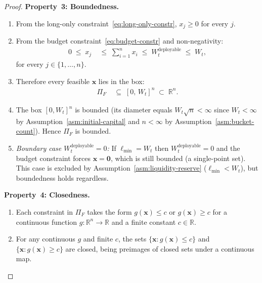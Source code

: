 \documentclass[12pt,openany]{book}
\newcommand{\bfx}{\mathbf{x}}
\numberwithin{equation}{chapter}
\theoremstyle{plain}
\theoremstyle{definition}
\theoremstyle{remark}
\numberwithin{equation}{chapter}
\theoremstyle{plain}
\begin{document}
\begin{proof}
\medskip
\noindent\textbf{Property~3: Boundedness.}

\begin{enumerate}
  \item From the long-only constraint~\eqref{eq:long-only-constr},
        $x_j \geq 0$ for every $j$.

  \item From the budget constraint~\eqref{eq:budget-constr} and
        non-negativity:
        \begin{align}
          0 \;\leq\; x_j
          &\;\leq\; \sum_{i=1}^n x_i
           \;\leq\; W_t^{\mathrm{deployable}}
           \;\leq\; W_t,
        \end{align}
        for every $j \in \{1,\ldots,n\}$.

  \item Therefore every feasible $\bfx$ lies in the box:
        \begin{align}
          \Pi_F &\;\subseteq\; [0,\, W_t]^n \;\subset\; \mathbb{R}^n.
        \end{align}

  \item The box $[0, W_t]^n$ is bounded (its diameter equals
        $W_t \sqrt{n} < \infty$ since $W_t < \infty$ by
        Assumption~\ref{asm:initial-capital} and $n < \infty$ by
        Assumption~\ref{asm:bucket-count}).  Hence $\Pi_F$ is bounded.

  \item \textit{Boundary case $W_t^{\mathrm{deployable}} = 0$:}
        If $\ell_{\min} = W_t$ then $W_t^{\mathrm{deployable}} = 0$
        and the budget constraint forces $\bfx = \mathbf{0}$, which
        is still bounded (a single-point set).
        This case is excluded by Assumption~\ref{asm:liquidity-reserve}
        ($\ell_{\min} < W_t$), but boundedness holds regardless.
\end{enumerate}

\medskip
\noindent\textbf{Property~4: Closedness.}

\begin{enumerate}
  \item Each constraint in $\Pi_F$ takes the form
        $g(\bfx) \leq c$ or $g(\bfx) \geq c$ for a continuous
        function $g : \mathbb{R}^n \to \mathbb{R}$ and a finite
        constant $c \in \mathbb{R}$.

  \item For any continuous $g$ and finite $c$, the sets
        $\{\bfx : g(\bfx) \leq c\}$ and $\{\bfx : g(\bfx) \geq c\}$
        are closed, being preimages of closed sets under a continuous
        map.


\end{enumerate}
\end{proof}
\end{document}

